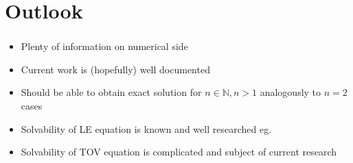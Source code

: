 \section{Outlook}

\begin{frame}
	\frametitle{\insertsection}
	\begin{itemize}[<+->]
		\item Plenty of information on numerical side
		\item Current work is (hopefully) well documented
		\item Should be able to obtain exact solution for $n\in\mathbb{N}, n>1$ analogously to $n=2$ cases
		\item Solvability of LE equation is known and well researched eg. \cite{quittnerSuperlinearParabolicProblems2007a}
		\item Solvability of TOV equation is complicated and subject of current research \cite{martinsExistenceClassificationPseudoAsymptotic2019, boonsermSolutionGeneratingTheorems2007}
	\end{itemize}
\end{frame}
